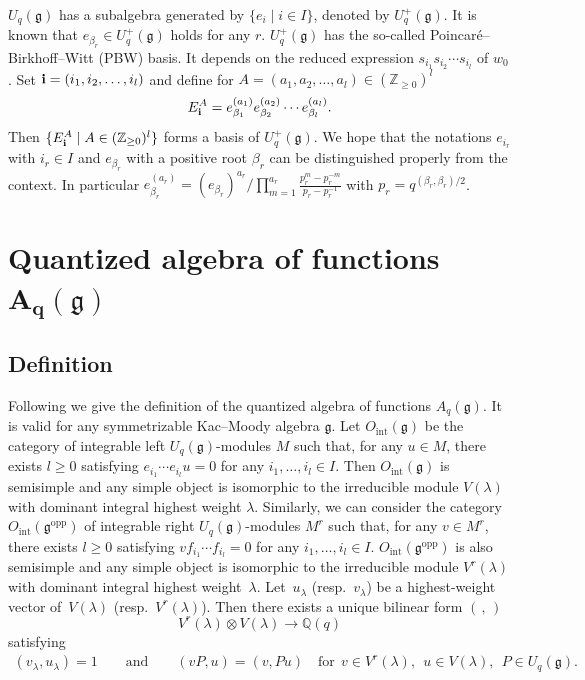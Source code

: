 \documentclass[pdftex]{sigma}
\newcommand{\geh}{\mathfrak{g}}
\newcommand{\la}{\lambda}
\newcommand{\ot}{\otimes}
\newcommand{\Z}{{\mathbb Z}}
\newcommand{\Q}{{\mathbb Q}}
\begin{document}
$U_q(\geh)$ has a subalgebra generated by $\{e_i\mid i\in I\}$, denoted by $U_q^+(\geh)$.
It is known that $e_{\beta_r} \in U^+_q(\geh)$ holds for any $r$.
$U^+_q(\geh)$ has the
so-called Poincar\'e--Birkhof\/f--Witt (PBW) basis. It depends on the reduced expression
$s_{i_1}s_{i_2}\cdots s_{i_l}$ of $w_0$. Set ${\bf i}=(i_1,i_2,\ldots,i_l)$ and def\/ine for
$A=(a_1,a_2,\ldots,a_l)\in(\Z_{\ge0})^l$
\begin{gather}\label{a:Eai}
E_{\bf i}^A=e_{\beta_1}^{(a_1)}e_{\beta_2}^{(a_2)}\cdots e_{\beta_l}^{(a_l)}.
\end{gather}
Then $\{E_{\bf i}^A\mid A\in(\Z_{\ge0})^l\}$ forms a basis of $U_q^+(\geh)$.
We hope that the notations $e_{i_r}$ with $i_r \in I$ and
$e_{\beta_r}$ with a positive root $\beta_r$
can be distinguished properly from the context.
In particular $e^{(a_r)}_{\beta_r}
= (e_{\beta_r})^{a_r}/\prod\limits_{m=1}^{a_r}\frac{p_r^m-p^{-m}_r}{p_r-p_r^{-1}}$
with $p_r = q^{(\beta_r, \beta_r)/2}$.




\section[Quantized algebra of functions $A_q(\geh)$]{Quantized algebra of functions $\boldsymbol{A_q(\geh)}$}\label{a:sec3}

\subsection{Def\/inition}

Following \cite{Kas93}
we give the def\/inition of the quantized algebra of functions $A_q(\geh)$.
It is valid for any symmetrizable Kac--Moody algebra $\geh$. Let $O_\mathrm{int}(\geh)$ be the
category of integrable left $U_q(\geh)$-modules $M$ such that, for any $u\in M$, there exists $l\ge0$
satisfying $e_{i_1}\cdots e_{i_l}u=0$ for any $i_1,\ldots,i_l\in I$. Then $O_\mathrm{int}(\geh)$
is semisimple and any simple object is isomorphic to the irreducible module $V(\la)$ with
dominant integral highest weight $\la$.
Similarly, we can consider the category $O_\mathrm{int}(\geh^\mathrm{opp})$ of integrable
right $U_q(\geh)$-modules $M^r$ such that, for any $v\in M^r$, there exists $l\ge0$ satisfying
$vf_{i_1}\cdots f_{i_l}=0$ for any $i_1,\ldots,i_l\in I$. $O_\mathrm{int}(\geh^\mathrm{opp})$
is also semisimple and any simple object is isomorphic to the irreducible module $V^r(\la)$ with
dominant integral highest weight~$\la$. Let~$u_\la$ (resp.~$v_\la$) be a highest-weight vector
of~$V(\la)$ (resp.~$V^r(\la)$). Then there exists a unique bilinear form $(\,,\,)$
\[
V^r(\la)\ot V(\la)\rightarrow \Q(q)
\]
satisfying
\begin{gather*}
(v_\la,u_\la) =1\qquad\text{and}\qquad
(vP,u) =(v,Pu)\quad\text{for} \ \ v\in V^r(\la), \ \ u\in V(\la), \ \ P\in U_q(\geh).
\end{gather*}
\end{document}
